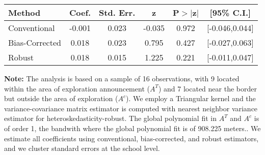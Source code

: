 \begin{table}[htbp]\centering
 \footnotesize 
\begin{tabular}{lccccc}
\hline\hline
Method & Coef. & Std. Err. & z & P$>|$z$|$ & [95\% C.I.] \\ 
\hline \hline  
Conventional & -0.001 & 0.023 & -0.035 & 0.972 & [-0.046,0.044] \\ 
 Bias-Corrected & 0.018 & 0.023 & 0.795 & 0.427 & [-0.027,0.063] \\ 
Robust & 0.018 & 0.015 & 1.225 & 0.221 & [-0.011,0.047] \\ 
  \hline\hline
\end{tabular}
\label{table:rd}
\begin{tablenotes} 
  \justifying \tiny \textbf{Note: }    
   The analysis is based on a sample of 16 observations, with 9 located within the area of exploration announcement ($A^{T}$) and 7 located near the border but outside the area of exploration  ($A^{c}$). 
           We employ a Triangular kernel and the variance-covariance matrix estimator is computed with nearest neighbor variance estimator for heteroskedasticity-robust. The global polynomial fit in  $A^{T}$ and $A^{c}$ is of order 1, the bandwith where the global polynomial fit is of 908.225 meters.. We estimate all coefficients using conventional, bias-corrected, and robust estimators, and we cluster standard errors at the school level. \end{tablenotes} 
 \end{table} 
